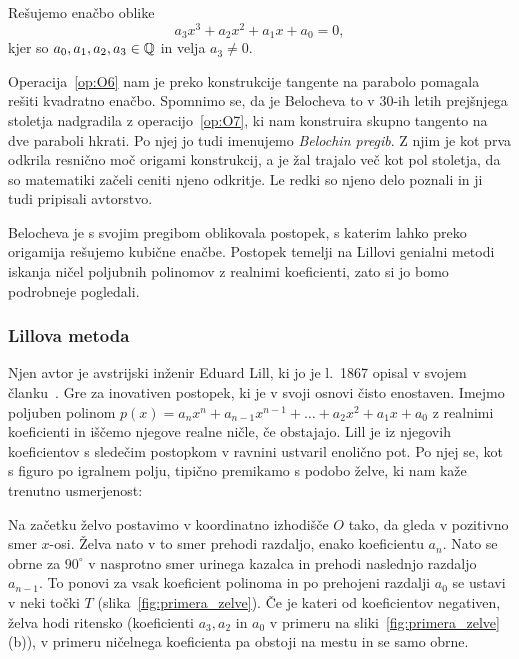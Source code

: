 Rešujemo enačbo oblike
$$ a_3 x^3 + a_2 x^2 + a_1 x + a_0 = 0, $$
kjer so $a_0, a_1, a_2, a_3 \in \mathbb Q$ in velja $a_3 \ne 0$.

Operacija~\ref{op:O6} nam je preko konstrukcije tangente na parabolo pomagala rešiti kvadratno enačbo. Spomnimo se, da je Belocheva to v 30-ih letih prejšnjega stoletja nadgradila z operacijo~\ref{op:O7}, ki nam konstruira skupno tangento na dve paraboli hkrati. Po njej jo tudi imenujemo \emph{Belochin pregib}. Z njim je kot prva odkrila resnično moč origami konstrukcij, a je žal trajalo več kot pol stoletja, da so matematiki začeli ceniti njeno odkritje. Le redki so njeno delo poznali in ji tudi pripisali avtorstvo.

Belocheva je s svojim pregibom oblikovala postopek, s katerim lahko preko origamija rešujemo kubične enačbe. Postopek temelji na Lillovi genialni metodi iskanja ničel poljubnih polinomov z realnimi koeficienti, zato si jo bomo podrobneje pogledali.

\subsubsection{Lillova metoda}

Njen avtor je avstrijski inženir Eduard Lill, ki jo je l.\ 1867 opisal v svojem članku~\cite{lill1867}. Gre za inovativen postopek, ki je v svoji osnovi čisto enostaven. Imejmo poljuben polinom $ p(x) = a_n x^n + a_{n-1} x^{n-1} + \ldots + a_2 x^2 + a_1 x + a_0 $ z realnimi koeficienti in iščemo njegove realne ničle, če obstajajo. Lill je iz njegovih koeficientov s sledečim postopkom v ravnini ustvaril enolično pot. Po njej se, kot s figuro po igralnem polju, tipično premikamo s podobo želve, ki nam kaže trenutno usmerjenost:

Na začetku želvo postavimo v koordinatno izhodišče $O$ tako, da gleda v pozitivno smer $x$-osi. Želva nato v to smer prehodi razdaljo, enako koeficientu $a_n$. Nato se obrne za $90^\circ$ v nasprotno smer urinega kazalca in prehodi naslednjo razdaljo $a_{n-1}$. To ponovi za vsak koeficient polinoma in po prehojeni razdalji $a_0$ se ustavi v neki točki $T$ (slika~\ref{fig:primera_zelve}). Če je kateri od koeficientov negativen, želva hodi ritensko (koeficienti $a_3, a_2$ in $a_0$ v primeru na sliki~\ref{fig:primera_zelve} (b)), v primeru ničelnega koeficienta pa obstoji na mestu in se samo obrne.

